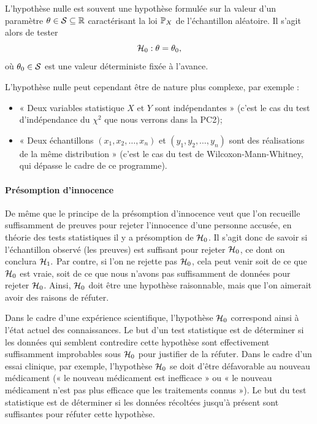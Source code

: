 L'hypothèse nulle est souvent une hypothèse formulée sur la valeur d'un paramètre
$\theta \in \mathcal{S} \subseteq \mathbb{R}$ caractérisant la loi $\mathbb{P}_X$ de l'échantillon
aléatoire. Il s'agit alors de tester
\begin{equation}
	\label{eq:h0}
	\mathcal{H}_0: \theta = \theta_0,
\end{equation}
où $\theta_0 \in \mathcal{S}$ est une valeur déterministe fixée à l'avance.

L'hypothèse nulle peut cependant être de nature plus complexe, par exemple :
\begin{itemize}
	\item « Deux variables statistique $X$ et $Y$ sont indépendantes » (c'est le
	cas du test d'indépendance du $\chi^2$ que nous verrons dans la PC2);
	\item « Deux échantillons $(x_1, x_2, \dots, x_n)$ et $(y_1, y_2, \dots, y_n)$
	sont des réalisations de la même distribution » (c'est le cas du test de
	Wilcoxon-Mann-Whitney, qui dépasse le cadre de ce programme).
\end{itemize}

\paragraph{Présomption d'innocence} De même que le principe de la présomption
d'innocence veut que l'on recueille suffisamment de preuves pour rejeter
l'innocence d'une personne accusée, en théorie des tests statistiques il y a
présomption de $\mathcal{H}_0$. Il s'agit donc de savoir si l'échantillon observé (les
preuves) est suffisant pour rejeter $\mathcal{H}_0$, ce dont on conclura $\mathcal{H}_1.$ Par
contre, si l'on ne rejette pas $\mathcal{H}_0$, cela peut venir soit de ce que $\mathcal{H}_0$
est vraie, soit de ce que nous n'avons pas suffisamment de données pour rejeter
$\mathcal{H}_0$. Ainsi, $\mathcal{H}_0$ doit être une hypothèse raisonnable, mais que l'on
aimerait avoir des raisons de réfuter.

Dans le cadre d'une expérience scientifique, l'hypothèse $\mathcal{H}_0$ correspond
ainsi à l'état actuel des connaissances. Le but d'un test statistique est de
déterminer si les données qui semblent contredire cette hypothèse sont
effectivement suffisamment improbables sous $\mathcal{H}_0$ pour justifier de la
réfuter.
Dans le cadre d'un essai clinique, par exemple, l'hypothèse $\mathcal{H}_0$ se doit
d'être défavorable au nouveau médicament (« le nouveau médicament est
inefficace » ou « le nouveau médicament n'est pas plus efficace que les
traitements connus »). Le but du test statistique est de déterminer si les
données récoltées jusqu'à présent sont suffisantes pour réfuter cette
hypothèse.

